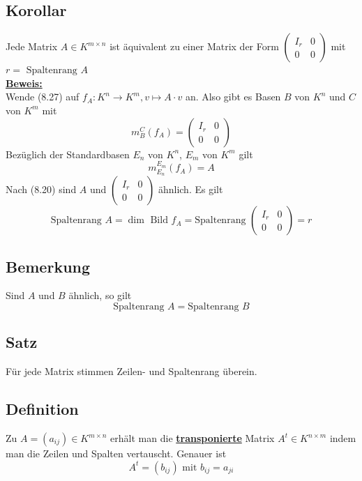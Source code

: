 \subsection{Korollar} %
\label{sub:korollar}
Jede Matrix $A \in K^{m \times n}$ ist äquivalent zu einer Matrix der Form $ \left( \begin{smallmatrix}
	I_r & 0 \\
	0 & 0
\end{smallmatrix} \right)$
mit $r=\text{ Spaltenrang }A$
\vspace{10pt} \\
\underline{\textbf{Beweis:}} \\
Wende (8.27) auf $f_A: K^n \to K^m , v \mapsto A \cdot v$ an. Also gibt es Basen $B$ von $K^n$ und $C$ von $K^m$ mit 
\[
	m_B^C(f_A) = \begin{pmatrix}
		I_r & 0 \\
		0 & 0
	\end{pmatrix}
\]
Bezüglich der Standardbasen $E_n$ von $K^n$, $E_m$ von $K^m$ gilt 
\[
	m_{E_n}^{E_m}(f_A)=A
\]
Nach (8.20) sind $A$ und $ \left (\begin{smallmatrix}
	I_r & 0 \\
	0 & 0
\end{smallmatrix} \right)$ ähnlich. Es gilt  
\[
	\text{Spaltenrang }A=  \dim \text{ Bild } f_A = \text{Spaltenrang } \left(\begin{smallmatrix}
	I_r & 0 \\
	0 & 0
\end{smallmatrix}\right) = r
\]

\subsection{Bemerkung} %
\label{sub:bemerkung}
Sind $A$ und $B$ ähnlich, so gilt 
\[
	\text{Spaltenrang }A = \text{Spaltenrang }B
\]

\subsection{Satz} %
\label{sub:satz}
Für jede Matrix stimmen Zeilen- und Spaltenrang überein.

\subsection{Definition} %
\label{sub:definition}
Zu $A= (a_{ij})\in K^{m \times n}$ erhält man die \underline{\textbf{transponierte}} Matrix $A^t \in K^{n \times m}$ indem man die Zeilen und Spalten
vertauscht. Genauer ist
\[
	A^t = (b_{ij}) \text{ mit } b_{ij}=a_{ji}
\]

